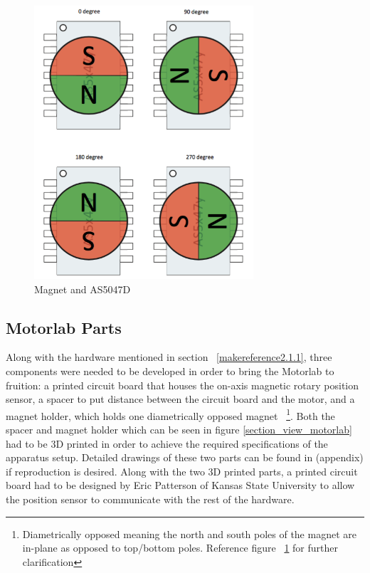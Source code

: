 \begin{figure}[htb]%
\begin{center}
    \includegraphics[height=4in]{figures/magnetic_field.png}

    \caption[Magnet and AS5047D]{Magnet and AS5047D \citep{1}}

    \label{magnet_rotation}
\end{center}
\end{figure}

\subsection{Motorlab Parts}
\label{makereference2.1.2} 

Along with the hardware mentioned in section ~\ref{makereference2.1.1}, three components were needed to be developed in order to bring the Motorlab to fruition: a printed circuit board that houses the on-axis magnetic rotary position sensor, a spacer to put distance between the circuit board and the motor, and a magnet holder, which holds one diametrically opposed magnet ~\footnote{Diametrically opposed meaning the north and south poles of the magnet are in-plane as opposed to top/bottom poles. Reference figure ~\ref{magnet_rotation} for further clarification}. Both the spacer and magnet holder which can be seen in figure \ref{section_view_motorlab} had to be 3D printed in order to achieve the required specifications of the apparatus setup. Detailed drawings of these two parts can be found in (appendix) if reproduction is desired. Along with the two 3D printed parts, a printed circuit board had to be designed by Eric Patterson of Kansas State University to allow the position sensor to communicate with the rest of the hardware.

